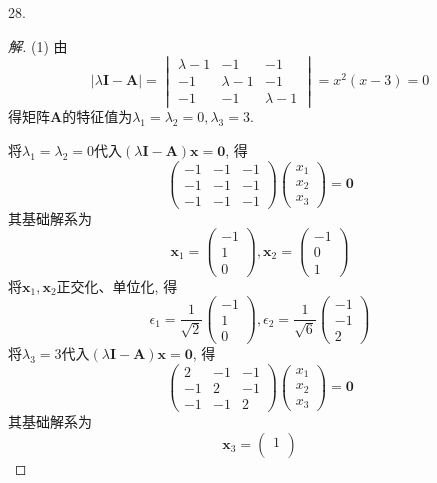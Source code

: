 \documentclass[10pt,a4paper]{report}
\def\*#1{\mathbf{#1}}
\begin{document}
28.
\begin{proof}[解]
	(1) 由
	\[|\lambda\*I - \*A| = \begin{vmatrix}
	\lambda - 1 & -1 & -1 \\
	-1 & \lambda-1 & -1 \\
	-1 & -1 & \lambda-1
	\end{vmatrix} = x^2(x-3) = 0\]
	得矩阵$\*A$的特征值为$\lambda_1 = \lambda_2 = 0, \lambda_3 = 3$.
	
	将$\lambda_1 = \lambda_2 = 0$代入$(\lambda\*I - \*A)\*x = \*0$, 得
	\[\begin{pmatrix}
	-1 & -1 & -1 \\
	-1 & -1 & -1 \\
	-1 & -1 & -1
	\end{pmatrix}
	\begin{pmatrix}
	x_1 \\
	x_2 \\
	x_3
	\end{pmatrix} = \*0\]
	其基础解系为
	\[\*x_1 = \begin{pmatrix}
	-1 \\
	1 \\
	0
	\end{pmatrix}, 
	\*x_2 = \begin{pmatrix}
	-1 \\
	0 \\
	1
	\end{pmatrix}\]
	将$\*x_1, \*x_2$正交化、单位化, 得
	\[\epsilon_1 = \frac{1}{\sqrt{2}}\begin{pmatrix}
	-1 \\
	1 \\
	0
	\end{pmatrix}, \epsilon_2 = \frac{1}{\sqrt{6}}\begin{pmatrix}
	-1 \\
	-1 \\
	2
	\end{pmatrix}\]
	将$\lambda_3 = 3$代入$(\lambda\*I - \*A)\*x = \*0$, 得
	\[\begin{pmatrix}
	2 & -1 & -1 \\
	-1 & 2 & -1 \\
	-1 & -1 & 2
	\end{pmatrix}
	\begin{pmatrix}
	x_1 \\
	x_2 \\
	x_3
	\end{pmatrix} = \*0\]
	其基础解系为
	\[\*x_3 = \begin{pmatrix}
	1 \\

\end{pmatrix}\]
\end{proof}
\end{document}
